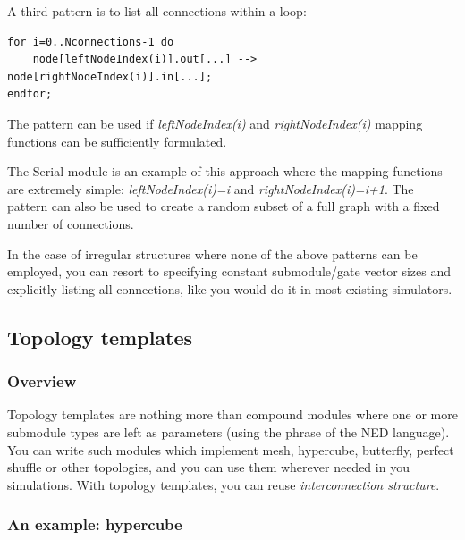A third pattern is to list all connections within a loop:

\begin{Verbatim}[commandchars=\\\{\}]
for i=0..Nconnections-1 do
    node[leftNodeIndex(i)].out[...] --> node[rightNodeIndex(i)].in[...];
endfor;
\end{Verbatim}

The pattern can be used if \textit{leftNodeIndex(i)} and \textit{rightNodeIndex(i)}
mapping functions can be sufficiently formulated.

The Serial module is an example of this approach where the mapping
functions are extremely simple: \textit{leftNodeIndex(i)=i} and \textit{rightNodeIndex(i)=i+1}.
The pattern can also be used to create a random subset of a full
graph with a fixed number of connections.

In the case of irregular structures where none of the above patterns
can be employed, you can resort to specifying constant submodule/gate
vector sizes and explicitly listing all connections, like you
would do it in most existing simulators.




\subsection{Topology templates}
\label{sec:ch-ned-lang:topology-templates}


\subsubsection{Overview}


Topology templates are nothing more than compound modules where one or
more submodule types are left as parameters (using the
 phrase of the NED language).  You can
write such modules which implement mesh,
hypercube,
butterfly, perfect
shuffle or other topologies, and you
can use them wherever needed in you simulations.  With topology
templates, you can reuse
\textit{interconnection structure}.



\subsubsection{An example: hypercube}


